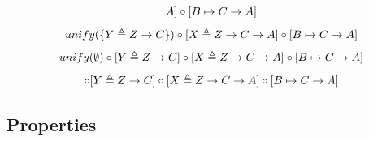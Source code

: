 \documentclass[8pt]{beamer}
\begin{document}
\begin{frame}
\begin{overprint}
\begin{displaymath}
                A]\circ[B\mapsto C\rightarrow A]\\
    \end{displaymath}
    \begin{displaymath}
             unify(\{ Y \triangleq  Z \rightarrow
                    C\})\circ[ X \triangleq  Z \rightarrow C\rightarrow
                A]\circ[B\mapsto C\rightarrow A]\\
    \end{displaymath}
    \begin{displaymath}
             unify(\emptyset)\circ[ Y \triangleq  Z \rightarrow
                    C]\circ[ X \triangleq  Z \rightarrow C\rightarrow
                A]\circ[B\mapsto C\rightarrow A]\\
    \end{displaymath}
    \begin{displaymath}
             []\circ[ Y \triangleq  Z \rightarrow
                    C]\circ[ X \triangleq  Z \rightarrow C\rightarrow
                A]\circ[B\mapsto C\rightarrow A]\\
    \end{displaymath}
    \end{overprint}
\end{frame}

\subsection{Properties}
\end{document}
